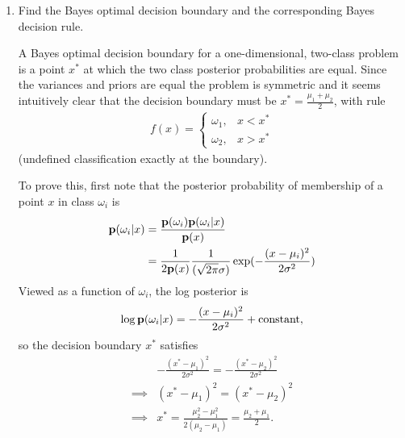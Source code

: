 \begin{enumerate}[label=(\alph*)]

\item Find the Bayes optimal decision boundary and the corresponding Bayes decision rule.
    \begin{mdframed}
      A Bayes optimal decision boundary for a one-dimensional, two-class
      problem is a point $x^*$ at which the two class posterior probabilities
      are equal. Since the variances and priors are equal the problem is
      symmetric and it seems intuitively clear that the decision boundary must
      be $x^* = \frac{\mu_1 + \mu_2}{2}$, with rule
      \begin{align*}
        f(x) =
        \begin{cases}
          \omega_1, &x < x^* \\
          \omega_2, &x > x^*
        \end{cases}
      \end{align*}
      (undefined classification exactly at the boundary).

      To prove this, first note that the posterior probability of membership of
      a point $x$ in class $\omega_i$ is
      \begin{align*}
        \mathbf{p}(\omega_i|x)
        &= \frac{\mathbf{p}(\omega_i)\mathbf{p}(\omega_i|x)}{\mathbf{p}(x)} \\
        &= \frac{1}{2\mathbf{p}(x)} \frac{1}{(\sqrt{2\pi}\sigma)}\exp(-\frac{(x - \mu_i)^2}{2\sigma^2})
      \end{align*}
      Viewed as a function of $\omega_i$, the log posterior is
      \begin{align*}
        \log \mathbf{p}(\omega_i|x) = -\frac{(x - \mu_i)^2}{2\sigma^2} + \text{constant},
      \end{align*}
      so the decision boundary $x^*$ satisfies
      \begin{align*}
        &-\frac{(x^* - \mu_1)^2}{2\sigma^2} = -\frac{(x^* - \mu_2)^2}{2\sigma^2} \\
        \implies&(x^* - \mu_1)^2 = (x^* - \mu_2)^2 \\
        \implies&x^* = \frac{\mu_2^2 - \mu_1^2}{2(\mu_2 - \mu_1)} = \frac{\mu_2 + \mu_1}{2}. \\
      \end{align*}


\end{mdframed}
\end{enumerate}
